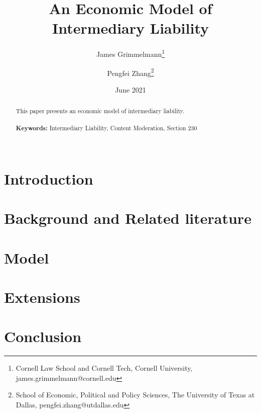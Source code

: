 \documentclass[openbib,12pt]{article}  %
\title{An Economic Model of Intermediary Liability}
\author{James Grimmelmann\footnote{Cornell Law School and Cornell Tech, Cornell University, james.grimmelmann@cornell.edu}
\and Pengfei Zhang\footnote{School of Economic, Political and Policy Sciences, The University of Texas at Dallas, pengfei.zhang@utdallas.edu}}
\date{June 2021}
\begin{document}
\maketitle
\begin{abstract}
\noindent This paper presents an economic model of intermediary liability. \\
\vspace{0in}\\
\noindent\textbf{Keywords:} Intermediary Liability, Content Moderation, Section 230 \\
\vspace{0in}\\

\bigskip
\end{abstract}

\newpage

\section{Introduction}\label{EMIL_Section:intro}


\section{Background and Related literature}\label{EMIL_Section:inst}


\section{Model}\label{EMIL_Section:model}


\section{Extensions}\label{EMIL_Section:ext}


\section{Conclusion}\label{EMIL_Section:conclude}


\newpage
\appendix
\label{Appendix:proofs}
\end{document}
